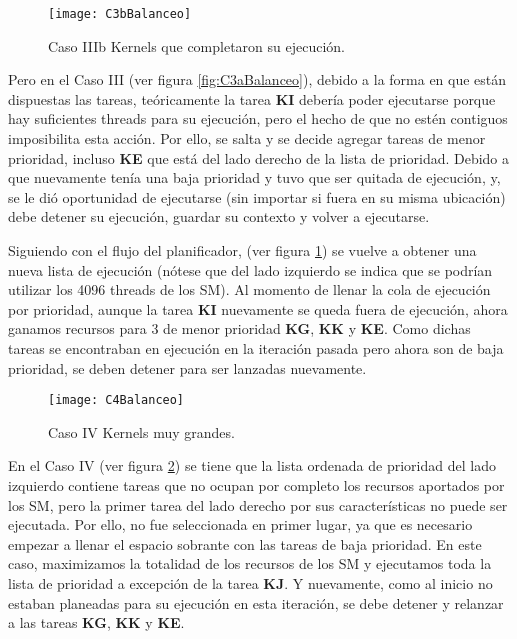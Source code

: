     \begin{figure}[!]
      \centering
        \texttt{[image: C3bBalanceo]}
        \caption{Caso IIIb Kernels que completaron su ejecución.}
        \label{fig:C3bBalanceo}
    \end{figure}
    
    Pero en el Caso III (ver figura \ref{fig:C3aBalanceo}), debido a la forma en que están dispuestas las tareas, teóricamente la tarea \textbf{KI} debería poder ejecutarse porque hay suficientes threads para su ejecución, pero el hecho de que no estén contiguos imposibilita esta acción. 
    Por ello, se salta y se decide agregar tareas de menor prioridad, incluso \textbf{KE} que está del lado derecho de la lista de prioridad. Debido a que nuevamente tenía una baja prioridad y tuvo que ser quitada de ejecución, y, se le dió oportunidad de ejecutarse (sin importar si fuera en su misma ubicación) debe detener su ejecución, guardar su contexto y volver a ejecutarse.
\newline

    Siguiendo con el flujo del planificador, (ver figura \ref{fig:C3bBalanceo}) se vuelve a obtener una nueva lista de ejecución (nótese que del lado izquierdo se indica que se podrían utilizar los 4096 threads de los SM). Al momento de llenar la cola de ejecución por prioridad, aunque la tarea  \textbf{KI} nuevamente se queda fuera de ejecución, ahora ganamos recursos para 3 de menor prioridad \textbf{KG}, \textbf{KK} y \textbf{KE}. Como dichas tareas se encontraban en ejecución en la iteración pasada pero ahora son de baja prioridad, se deben detener para ser lanzadas nuevamente.
\newline

    \begin{figure}[!]
      \centering
        \texttt{[image: C4Balanceo]}
        \caption{Caso IV Kernels muy grandes.}
        \label{fig:C4Balanceo}
    \end{figure}
    
    En el Caso IV (ver figura \ref{fig:C4Balanceo}) se tiene que la lista ordenada de prioridad del lado izquierdo contiene tareas que no ocupan por completo los recursos aportados por los SM, pero la primer tarea del lado derecho por sus características no puede ser ejecutada. 
    Por ello, no fue seleccionada en primer lugar, ya que es necesario empezar a llenar el espacio sobrante con las tareas de baja prioridad. En este caso, maximizamos la totalidad de los recursos de los SM y ejecutamos toda la lista de prioridad a excepción de la tarea \textbf{KJ}. Y nuevamente, como al inicio no estaban planeadas para su ejecución en esta iteración, se debe detener y relanzar a las tareas \textbf{KG}, \textbf{KK} y \textbf{KE}.
\newline

